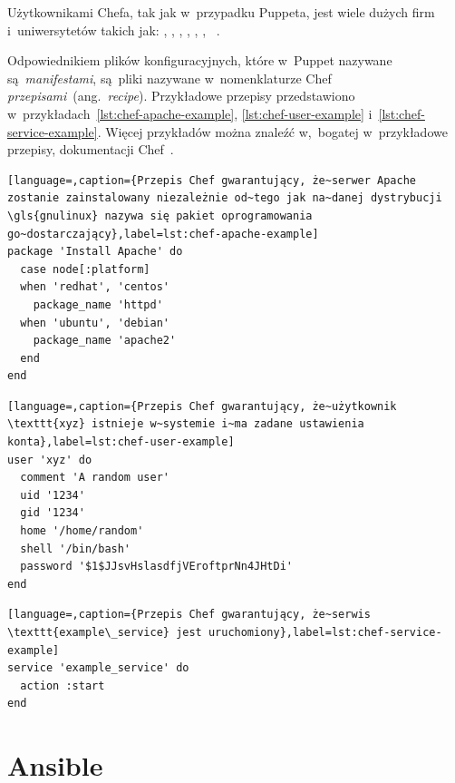 \documentclass[thesis]{subfiles}
\begin{document}
Użytkownikami Chefa, tak jak w~przypadku Puppeta, jest wiele dużych firm i~uniwersytetów takich jak: , , , , , , ~\cite{chef-customers,puppet-chef-disney}.

Odpowiednikiem plików konfiguracyjnych, które w~Puppet nazywane są~\emph{manifestami}, są~pliki nazywane w~nomenklaturze Chef \emph{przepisami}~(ang.~\emph{recipe}). Przykładowe przepisy przedstawiono w~przykładach~\ref{lst:chef-apache-example}, \ref{lst:chef-user-example} i~\ref{lst:chef-service-example}. Więcej przykładów można znaleźć w,~bogatej w~przykładowe przepisy, dokumentacji Chef~\cite{chef-examples}.

\begin{lstlisting}[language=,caption={Przepis Chef gwarantujący, że~serwer Apache zostanie zainstalowany niezależnie od~tego jak na~danej dystrybucji \gls{gnulinux} nazywa się pakiet oprogramowania go~dostarczający},label=lst:chef-apache-example]
package 'Install Apache' do
  case node[:platform]
  when 'redhat', 'centos'
    package_name 'httpd'
  when 'ubuntu', 'debian'
    package_name 'apache2'
  end
end
\end{lstlisting}

\begin{lstlisting}[language=,caption={Przepis Chef gwarantujący, że~użytkownik \texttt{xyz} istnieje w~systemie i~ma zadane ustawienia konta},label=lst:chef-user-example]
user 'xyz' do
  comment 'A random user'
  uid '1234'
  gid '1234'
  home '/home/random'
  shell '/bin/bash'
  password '$1$JJsvHslasdfjVEroftprNn4JHtDi'
end
\end{lstlisting}

\begin{lstlisting}[language=,caption={Przepis Chef gwarantujący, że~serwis \texttt{example\_service} jest uruchomiony},label=lst:chef-service-example]
service 'example_service' do
  action :start
end
\end{lstlisting}


\section{Ansible}
\label{sec:ansible}
\end{document}
